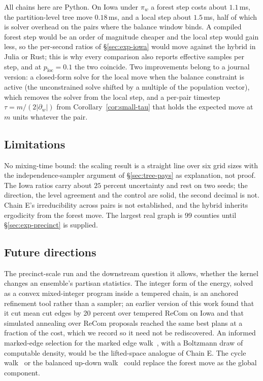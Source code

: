 \documentclass[11pt]{article}
\begin{document}
All chains here are Python. On Iowa under $\pi_w$ a forest step costs
about $1.1$\,ms, the partition-level tree move $0.18$\,ms, and a local
step about $1.5$\,ms, half of which is solver overhead on the pairs
where the balance window binds. A compiled forest step would be an
order of magnitude cheaper and the local step would gain less, so the
per-second ratios of \S\ref{sec:exp-iowa} would move against the
hybrid in Julia or Rust; this is why every comparison also reports
effective samples per step, and at $p_{\mathrm{loc}} = 0.1$ the two
coincide. Two improvements belong to a journal version: a closed-form
solve for the local move when the balance constraint is active (the
unconstrained solve shifted by a multiple of the population vector),
which removes the solver from the local step, and a per-pair timestep
$\tau = m/(2|\partial_w|)$ from Corollary~\ref{cor:small-tau} that
holds the expected move at $m$ units whatever the pair.

\subsection{Limitations}\label{sec:disc-limits}

No mixing-time bound: the scaling result is a straight line over six
grid sizes with the independence-sampler argument of
\S\ref{sec:tree-pays} as explanation, not proof. The Iowa ratios carry
about $25$ percent uncertainty and rest on two seeds; the direction,
the level agreement and the control are solid, the second decimal is
not. Chain E's irreducibility across pairs is not established, and the
hybrid inherits ergodicity from the forest move. The largest real graph
is 99 counties until \S\ref{sec:exp-precinct} is supplied.

\subsection{Future directions}\label{sec:disc-future}

The precinct-scale run and the downstream question it allows, whether
the kernel changes an ensemble's partisan statistics. The integer form
of the energy, solved as a convex mixed-integer program inside a
tempered chain, is an anchored refinement tool rather than a sampler;
an earlier version of this work found that it cut mean cut edges by
20 percent over tempered ReCom on Iowa and that simulated annealing
over ReCom proposals reached the same best plans at a fraction of the
cost, which we record so it need not be rediscovered. An informed
marked-edge selection for the marked edge
walk~\cite{mcwhorter2025marked}, with a Boltzmann draw of computable
density, would be the lifted-space analogue of Chain E. The cycle
walk~\cite{deford2025cycle} or the balanced up-down
walk~\cite{akitaya2026bud} could replace the forest move as the global
component.
\end{document}
